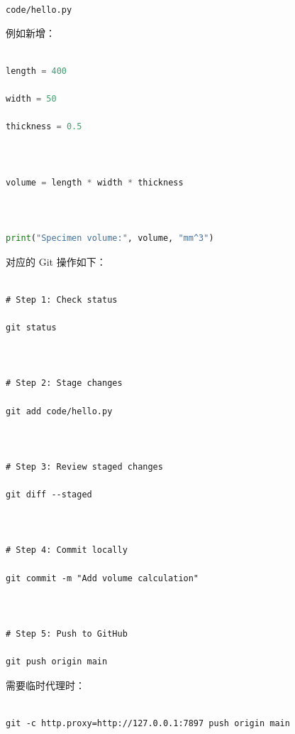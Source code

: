 \texttt{code/hello.py}



例如新增：



\begin{lstlisting}[language=Python]

length = 400

width = 50

thickness = 0.5



volume = length * width * thickness



print("Specimen volume:", volume, "mm^3")

\end{lstlisting}



对应的 Git 操作如下：



\begin{lstlisting}

# Step 1: Check status

git status



# Step 2: Stage changes

git add code/hello.py



# Step 3: Review staged changes

git diff --staged



# Step 4: Commit locally

git commit -m "Add volume calculation"



# Step 5: Push to GitHub

git push origin main

\end{lstlisting}



需要临时代理时：



\begin{lstlisting}

git -c http.proxy=http://127.0.0.1:7897 push origin main

\end{lstlisting}






